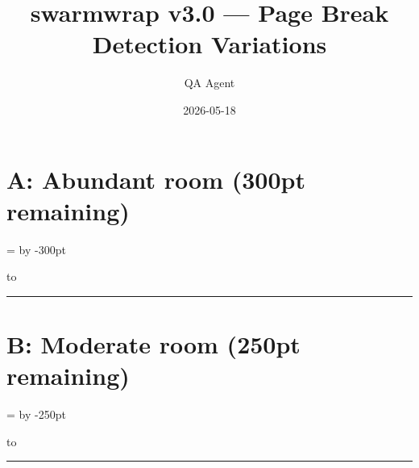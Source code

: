 \documentclass[a4paper,11pt]{article}
\title{swarmwrap v3.0 — Page Break Detection Variations}
\author{QA Agent}
\date{2026-05-18}
\begin{document}
\maketitle

\newdimen\pbht


\section*{A: Abundant room (300pt remaining)}

\pbht=\textheight
\advance\pbht by -300pt

\vbox to\pbht{%
  \lipsum[1-2]%
  \vss
}%

\begin{swarmwrap}%
  \begin{minipage}[t]{3cm}
    \centering
    \rule{\linewidth}{2.5cm}
  \end{minipage}%
\end{swarmwrap}%
\swarmwrapnext
\lipsum[1]

\newpage
\section*{B: Moderate room (250pt remaining)}

\pbht=\textheight
\advance\pbht by -250pt

\vbox to\pbht{%
  \lipsum[1-2]%
  \vss
}%

\begin{swarmwrap}%
  \begin{minipage}[t]{3cm}
    \centering
    \rule{\linewidth}{2.5cm}
  \end{minipage}%
\end{swarmwrap}%
\swarmwrapnext
\lipsum[1]

\newpage
\end{document}
